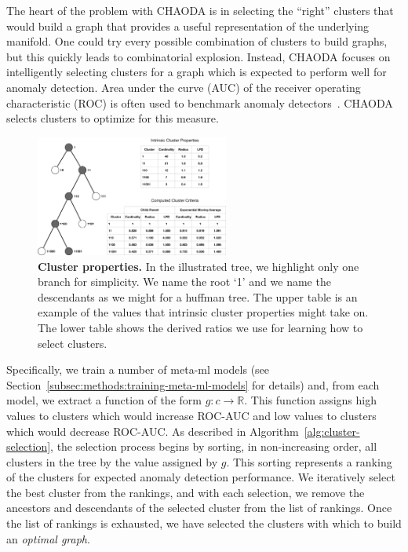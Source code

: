 The heart of the problem with CHAODA is in selecting the ``right'' clusters that would build a graph that provides a useful representation of the underlying manifold.
One could try every possible combination of clusters to build graphs, but this quickly leads to combinatorial explosion.
Instead, CHAODA focuses on intelligently selecting clusters for a graph which is expected to perform well for anomaly detection.
Area under the curve (AUC) of the receiver operating characteristic (ROC) is often used to benchmark anomaly detectors~\cite{fawcett2006introduction}.
CHAODA selects clusters to optimize for this measure.

\begin{figure}[ht!]
    \centering
    \includegraphics[width=2.5in]{images/chaoda-cluster-properties.pdf}
    \caption{
        \textbf{Cluster properties.}
        In the illustrated tree, we highlight only one branch for simplicity.
        We name the root `1' and we name the descendants as we might for a huffman tree.
        The upper table is an example of the values that intrinsic cluster properties might take on.
        The lower table shows the derived ratios we use for learning how to select clusters.
    }
    \label{fig:methods:cluster-properties}
\end{figure}

Specifically, we train a number of meta-ml models (see Section~\ref{subsec:methods:training-meta-ml-models} for details) and, from each model, we extract a function of the form $g : c \rightarrow \mathbb{R}$.
This function assigns high values to clusters which would increase ROC-AUC and low values to clusters which would decrease ROC-AUC.
As described in Algorithm~\ref{alg:cluster-selection}, the selection process begins by sorting, in non-increasing order, all clusters in the tree by the value assigned by $g$.
This sorting represents a ranking of the clusters for expected anomaly detection performance.
We iteratively select the best cluster from the rankings, and with each selection, we remove the ancestors and descendants of the selected cluster from the list of rankings.
Once the list of rankings is exhausted, we have selected the clusters with which to build an \textit{optimal graph}.

